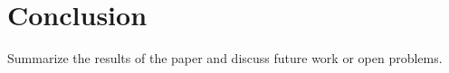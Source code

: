 \documentclass[12pt]{article}
\begin{document}
\section{Conclusion}
Summarize the results of the paper and discuss future work or open problems.




























\end{document}
